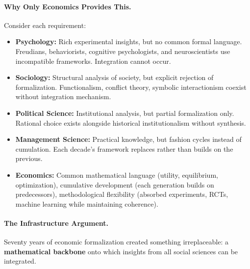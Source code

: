 \paragraph{Why Only Economics Provides This.}
Consider each requirement:
\begin{itemize}[nosep]
    \item \textbf{Psychology:} Rich experimental insights, but no common formal language.
        Freudians, behaviorists, cognitive psychologists, and neuroscientists use
        incompatible frameworks. Integration cannot occur.
    \item \textbf{Sociology:} Structural analysis of society, but explicit rejection of
        formalization. Functionalism, conflict theory, symbolic interactionism coexist
        without integration mechanism.
    \item \textbf{Political Science:} Institutional analysis, but partial formalization only.
        Rational choice exists alongside historical institutionalism without synthesis.
    \item \textbf{Management Science:} Practical knowledge, but fashion cycles instead of
        cumulation. Each decade's framework replaces rather than builds on the previous.
    \item \textbf{Economics:} Common mathematical language (utility, equilibrium, optimization),
        cumulative development (each generation builds on predecessors), methodological
        flexibility (absorbed experiments, RCTs, machine learning while maintaining coherence).
\end{itemize}

\paragraph{The Infrastructure Argument.}
Seventy years of economic formalization created something irreplaceable: a \textbf{mathematical
backbone} onto which insights from all social sciences can be integrated.

